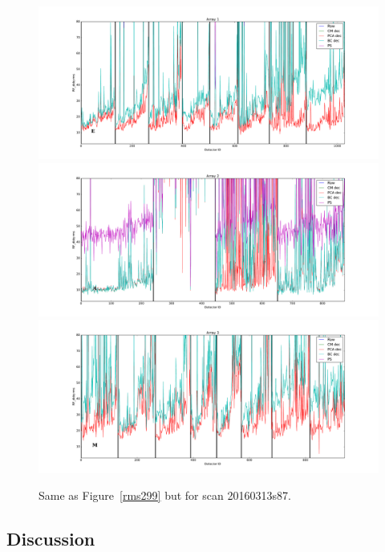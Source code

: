 \begin{figure}[ht] %
\begin{center}
\includegraphics[scale=0.26]{Figures/DarkTests/rms_TOI_array_1_20160313s87.pdf} 
\includegraphics[scale=0.26]{Figures/DarkTests/rms_TOI_array_2_20160313s87.pdf} 
\includegraphics[scale=0.26]{Figures/DarkTests/rms_TOI_array_3_20160313s87.pdf} 
\end{center}
\caption{Same as Figure~\ref{rms299} but for scan 20160313s87. \label{rms87}}
\end{figure}



\subsection{Discussion}


